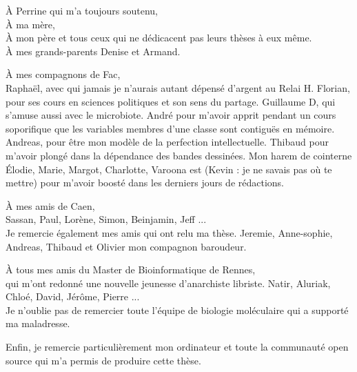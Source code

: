 \documentclass[12pt,a4paper]{article}
\begin{document}
\begin{flushleft}

À Perrine qui m'a toujours soutenu, \\ 
\vspace{0.5cm}
À ma mère, \\
À mon père et tous ceux qui ne dédicacent pas leurs thèses à eux même. \\ 
À mes grands-parents Denise et Armand. \\ 

\vspace{0.5cm}



\vspace{1cm}

À mes compagnons de Fac,\\
Raphaël, avec qui jamais je n'aurais autant dépensé d'argent au Relai H. Florian, pour ses cours en sciences politiques et son sens du partage. Guillaume D,  qui s'amuse aussi avec le microbiote. André pour m'avoir apprit pendant un cours soporifique que les variables membres d'une classe sont contiguës en mémoire. Andreas, pour être mon modèle de la perfection intellectuelle. Thibaud pour m'avoir plongé dans la dépendance des bandes dessinées. Mon harem de cointerne Élodie, Marie, Margot, Charlotte, Varoona est (Kevin : je ne savais pas où te mettre) pour m'avoir boosté dans les derniers jours de rédactions. 

\vspace{0.5cm}
À mes amis de Caen, \\
Sassan, Paul, Lorène, Simon, Beinjamin, Jeff ...\\
Je remercie également mes amis qui ont relu ma thèse. Jeremie, Anne-sophie, Andreas, Thibaud et Olivier mon compagnon baroudeur. \\

\vspace{0.5cm}

À tous mes amis du Master de Bioinformatique de Rennes, \\
qui m'ont redonné une nouvelle jeunesse d'anarchiste libriste. Natir, Aluriak, Chloé, David, Jérôme, Pierre ... \\

\vspace{0.5cm}
Je n'oublie pas de remercier toute l'équipe de biologie moléculaire qui a supporté ma maladresse. \\ 
\vspace{0.5cm}

Enfin, je remercie particulièrement mon ordinateur et toute la communauté open source qui m'a permis de produire cette thèse. 

\vspace{0.5cm}

\end{flushleft}
\newpage
\tableofcontents
\newpage
\listoffigures
\newpage
\listoftables
\newpage
\end{document}
